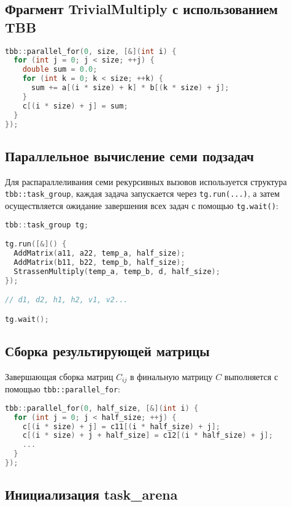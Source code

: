 \documentclass[14pt,a4paper]{extarticle}
\begin{document}
\subsection*{Фрагмент TrivialMultiply с использованием TBB}

\begin{lstlisting}[language=C++]
tbb::parallel_for(0, size, [&](int i) {
  for (int j = 0; j < size; ++j) {
    double sum = 0.0;
    for (int k = 0; k < size; ++k) {
      sum += a[(i * size) + k] * b[(k * size) + j];
    }
    c[(i * size) + j] = sum;
  }
});
\end{lstlisting}

\subsection*{Параллельное вычисление семи подзадач}

Для распараллеливания семи рекурсивных вызовов используется структура \texttt{tbb::task\_group}, каждая задача запускается через \texttt{tg.run(...)}, а затем осуществляется ожидание завершения всех задач с помощью \texttt{tg.wait()}:

\begin{lstlisting}[language=C++]
tbb::task_group tg;

tg.run([&]() {
  AddMatrix(a11, a22, temp_a, half_size);
  AddMatrix(b11, b22, temp_b, half_size);
  StrassenMultiply(temp_a, temp_b, d, half_size);
});

// d1, d2, h1, h2, v1, v2...

tg.wait();
\end{lstlisting}

\subsection*{Сборка результирующей матрицы}

Завершающая сборка матриц $C_{ij}$ в финальную матрицу $C$ выполняется с помощью \texttt{tbb::parallel\_for}:

\begin{lstlisting}[language=C++]
tbb::parallel_for(0, half_size, [&](int i) {
  for (int j = 0; j < half_size; ++j) {
    c[(i * size) + j] = c11[(i * half_size) + j];
    c[(i * size) + j + half_size] = c12[(i * half_size) + j];
    ...
  }
});
\end{lstlisting}

\subsection*{Инициализация task\_arena}
\end{document}
